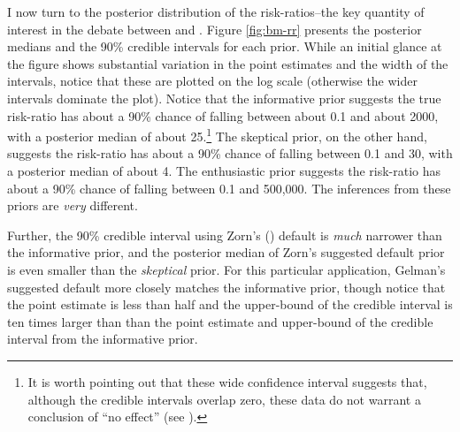 \documentclass[12pt]{article}
\begin{document}
I now turn to the posterior distribution of the risk-ratios--the key quantity of interest in the debate between \cite{BellMiller2014} and \cite{Rauchhaus2009}. Figure \ref{fig:bm-rr} presents the posterior medians and the 90\% credible intervals for each prior. While an initial glance at the figure shows substantial variation in the point estimates and the width of the intervals, notice that these are plotted on the log scale (otherwise the wider intervals dominate the plot). Notice that the informative prior suggests the true risk-ratio has about a 90\% chance of falling between about 0.1 and about 2000, with a posterior median of about 25.\footnote{It is worth pointing out that these wide confidence interval suggests that, although the credible intervals overlap zero, these data do not warrant a conclusion of ``no effect'' (see \citealt{Rainey2014}).} The skeptical prior, on the other hand, suggests the risk-ratio has about a 90\% chance of falling between 0.1 and 30, with a posterior median of about 4. The enthusiastic prior suggests the risk-ratio has about a 90\% chance of falling between 0.1 and 500,000. The inferences from these priors are \emph{very} different. 

Further, the 90\% credible interval using Zorn's (\citeyear{Zorn2005}) default is \emph{much} narrower than the informative prior, and the posterior median of Zorn's suggested default prior is even smaller than the \emph{skeptical} prior. For this particular application, Gelman's suggested default more closely matches the informative prior, though notice that the point estimate is less than half and the upper-bound of the credible interval is ten times larger than than the point estimate and upper-bound of the credible interval from the informative prior.

\end{document}
